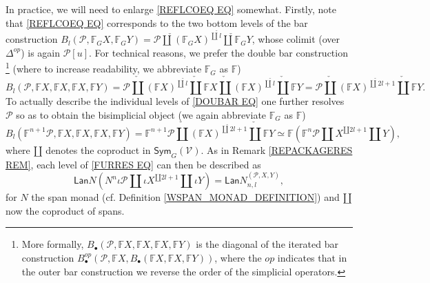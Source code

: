 \documentclass[a4paper,10pt
,draft
]{article}%
\numberwithin{equation}{section}
\numberwithin{figure}{section}
\theoremstyle{definition} %
\newcommand{\1}{\ensuremath{\mathbbm 1}}%
\begin{document}
In practice, we will need to enlarge 
\eqref{REFLCOEQ EQ} somewhat.
Firstly, note that \eqref{REFLCOEQ EQ}
corresponds to the two bottom levels of the bar construction
$B_l(\mathcal{P}, \mathbb{F}_G X, \mathbb{F}_G Y)=
\mathcal{P} \mathbin{\check{\amalg}}
(\mathbb{F}_G X)^{\check{\amalg} l} 
\mathbin{\check{\amalg}} \mathbb{F}_G Y$,
whose colimit (over $\Delta^{op}$) is again $\mathcal{P}[u]$.
For technical reasons, we prefer the double bar construction
\footnote{
More formally,
$B_{\bullet}(\mathcal{P}, \mathbb{F} X, \mathbb{F} X, \mathbb{F} X, \mathbb{F} Y)$
is the diagonal
of the iterated bar construction
$B^{op}_{\bullet}\left(\mathcal{P}, \mathbb{F} X, 
B_{\bullet}(\mathbb{F} X, \mathbb{F} X, \mathbb{F} Y)\right)$,
where the $op$ indicates that in the outer bar construction we reverse the order of the simplicial operators.
}
(where to increase readability, we 
abbreviate $\mathbb{F}_G$ as $\mathbb{F}$)
\begin{equation}\label{DOUBAR EQ}
	B_l(\mathcal{P}, \mathbb{F} X, \mathbb{F} X, \mathbb{F} X, \mathbb{F} Y)
=
	\mathcal{P} \mathbin{\check{\amalg}}
	(\mathbb{F} X)^{\check{\amalg} l} 
	\mathbin{\check{\amalg}}
	\mathbb{F} X
	\mathbin{\check{\amalg}}
	(\mathbb{F} X)^{\check{\amalg} l} 
	\mathbin{\check{\amalg}} \mathbb{F} Y
=
	\mathcal{P} \mathbin{\check{\amalg}}
	(\mathbb{F} X)^{\check{\amalg} 2l+1} 
	\mathbin{\check{\amalg}} \mathbb{F} Y.
\end{equation}
To actually describe the individual levels  of
\eqref{DOUBAR EQ} one further resolves $\mathcal{P}$
so as to obtain the bisimplicial object
(we again abbreviate $\mathbb{F}_G$ as $\mathbb{F}$)
\begin{equation}\label{FURRES EQ}
	B_l(\mathbb{F}^{n+1}\mathcal{P}, \mathbb{F} X, \mathbb{F} X, \mathbb{F} X, \mathbb{F} Y)
=
	\mathbb{F}^{n+1}\mathcal{P} \mathbin{\check{\amalg}}
	(\mathbb{F} X)^{\check{\amalg} 2l+1} 
	\mathbin{\check{\amalg}} \mathbb{F} Y
\simeq
	\mathbb{F}\left(
		\mathbb{F}^{n} \mathcal{P} \amalg
		X^{\amalg 2l+1} \amalg Y
	\right),
\end{equation}
where $\amalg$ denotes the coproduct in $\mathsf{Sym}_G(\mathcal{V})$.
As in Remark \ref{REPACKAGERES REM}, each level of 
\eqref{FURRES EQ}
can then be described as 
\begin{equation}\label{LANLEVELFOR EQ}
 \mathsf{Lan} N (N^{n} \iota \mathcal{P} 
\amalg \iota X^{\amalg 2l+1} \amalg \iota Y)
=
\mathsf{Lan} N^{(\mathcal P, X, Y)}_{n,l},
\end{equation}
for $N$ the span monad (cf. Definition \ref{WSPAN_MONAD_DEFINITION}) and $\amalg$ now the coproduct of spans.
\end{document}
